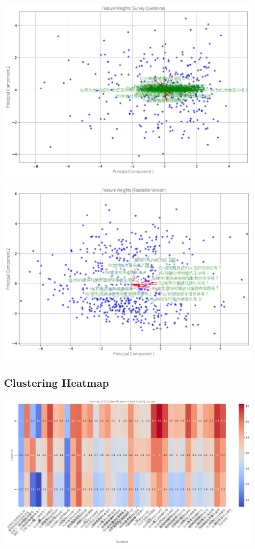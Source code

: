 \documentclass[
  letterpaper,
  DIV=11,
  numbers=noendperiod]{scrartcl}
\begin{document}
\includegraphics{_thesis_files/figure-pdf/cell-86-output-3.pdf}

\includegraphics{_thesis_files/figure-pdf/cell-86-output-4.pdf}

\subsection{Clustering Heatmap}\label{clustering-heatmap}

\includegraphics{_thesis_files/figure-pdf/cell-87-output-1.pdf}
\end{document}
